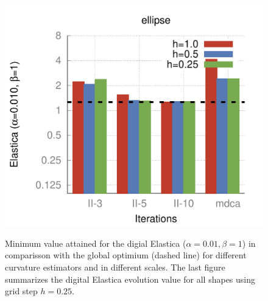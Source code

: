 \begin{figure}[]
{\includegraphics[scale=0.4]{figures/chapter5/flow/plots/bars/length_pen_0.01000/ellipse.pdf}
}\hspace{1em}%
%
\caption{Minimum value attained for the digial Elastica ($\alpha=0.01, \beta=1$) in comparisson with the global optimium (dashed line) for different curvature estimators and in different scales. The last figure summarizes the digital Elastica evolution value for all shapes using grid step $h=0.25$.}
\label{fig:local-comb-estimators-plots-lp001}
\end{figure}

